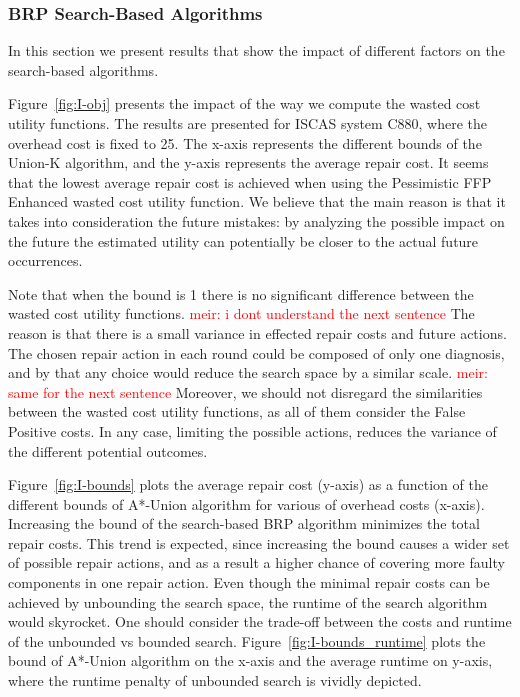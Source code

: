 \documentclass[review]{elsarticle}
\newcommand\meir[1]{\textcolor{red}{meir: #1}}
\begin{document}
\subsubsection{BRP Search-Based Algorithms}
In this section we present results that show the impact of different factors on the search-based algorithms.

Figure~\ref{fig:I-obj} presents the %
impact of the way we compute the wasted cost utility functions. The results are presented for ISCAS system C880, where the overhead cost is fixed to 25. The x-axis represents the different bounds of the Union-K algorithm, and the y-axis represents the average repair cost. It seems that the lowest average repair cost is achieved when using the Pessimistic FFP Enhanced wasted cost utility function. We believe that the main reason is that it takes into consideration the future mistakes: by analyzing the possible impact on the future the estimated utility can potentially be closer to the actual future occurrences.

Note that when the bound is 1 there is no significant difference between the wasted cost utility functions. \meir{i dont understand the next sentence} The reason is that there is a small variance in effected repair costs and future actions. The chosen repair action in each round could be composed of only one diagnosis, and by that any choice would reduce the search space by a similar scale. \meir{same for the next sentence} Moreover, we should not disregard the similarities between the wasted cost utility functions, as all of them consider the False Positive costs. In any case, limiting the possible actions, reduces the variance of the different potential outcomes.

Figure~\ref{fig:I-bounds} plots the average repair cost (y-axis) as a function of the different bounds of A*-Union algorithm for various of overhead costs (x-axis). Increasing the bound of the search-based BRP algorithm minimizes the total repair costs. 
This trend is expected, since increasing the bound causes a wider set of possible repair actions, and as a result a higher chance of covering more faulty components in one repair action.
Even though the minimal repair costs can be achieved by unbounding the search space, the runtime of the search algorithm would skyrocket. One should consider the trade-off between the costs and runtime of the unbounded vs bounded search. 
Figure~\ref{fig:I-bounds_runtime} plots the bound of A*-Union algorithm on the x-axis and the average runtime on y-axis, where the runtime penalty of unbounded search is vividly depicted.
\end{document}
